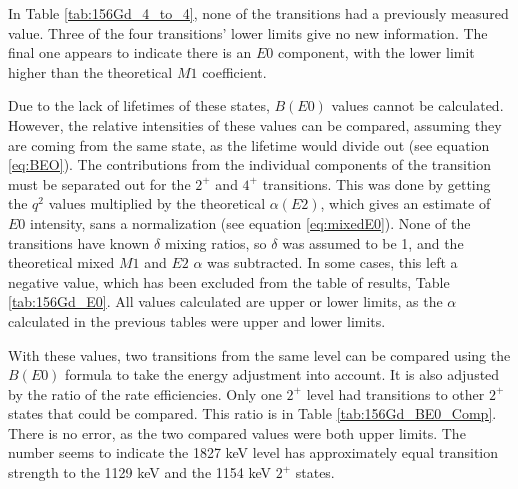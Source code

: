 In Table \ref{tab:156Gd_4_to_4}, none of the transitions had a previously measured value. Three of the four transitions' lower limits give no new information. The final one appears to indicate there is an $E0$ component, with the lower limit higher than the theoretical $M1$ coefficient. 
   
\afterpage{\clearpage}

Due to the lack of lifetimes of these states, $B(E0)$ values cannot be calculated. However, the relative intensities of these values can be compared, assuming they are coming from the same state, as the lifetime would divide out (see equation \ref{eq:BEO}). The contributions from the individual components of the transition must be separated out for the $2^+$ and $4^+$ transitions. This was done by getting the $q^2$ values multiplied by the theoretical $\alpha(E2)$, which gives an estimate of $E0$ intensity, sans a normalization (see equation \ref{eq:mixedE0}). None of the transitions have known $\delta$ mixing ratios, so $\delta$ was assumed to be 1, and the theoretical mixed $M1$ and $E2$ $\alpha$ was subtracted. In some cases, this left a negative value, which has been excluded from the table of results, Table \ref{tab:156Gd_E0}. All values calculated are upper or lower limits, as the $\alpha$ calculated in the previous tables were upper and lower limits.

\afterpage{\clearpage}

With these values, two transitions from the same level can be compared using the $B(E0)$ formula to take the energy adjustment into account. It is also adjusted by the ratio of the rate efficiencies. Only one $2^+$ level had transitions to other $2^+$ states that could be compared. This ratio is in Table \ref{tab:156Gd_BE0_Comp}. There is no error, as the two compared values were both upper limits. The number seems to indicate the 1827 keV level has approximately equal transition strength to the 1129 keV and the 1154 keV $2^+$ states.

\afterpage{\clearpage}